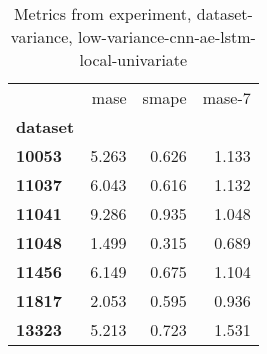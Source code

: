 \begin{table}[h]
\centering
\caption{Metrics from experiment, dataset-variance, low-variance-cnn-ae-lstm-local-univariate}
\label{table:low-variance-cnn-ae-lstm-local-univariate-dataset-variance}
\begin{tabular}{lrrr}
\toprule
{} &   mase &  smape &  mase-7 \\
\textbf{dataset} &        &        &         \\
\midrule
\textbf{10053  } &  5.263 &  0.626 &   1.133 \\
\textbf{11037  } &  6.043 &  0.616 &   1.132 \\
\textbf{11041  } &  9.286 &  0.935 &   1.048 \\
\textbf{11048  } &  1.499 &  0.315 &   0.689 \\
\textbf{11456  } &  6.149 &  0.675 &   1.104 \\
\textbf{11817  } &  2.053 &  0.595 &   0.936 \\
\textbf{13323  } &  5.213 &  0.723 &   1.531 \\
\bottomrule
\end{tabular}
\end{table}
